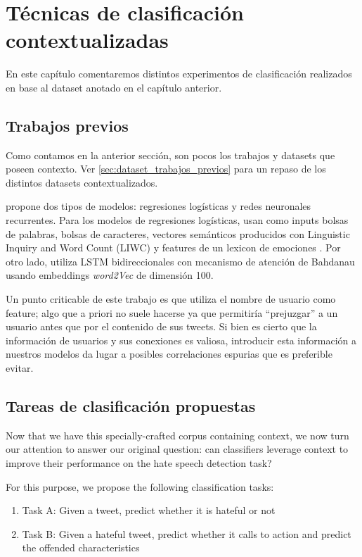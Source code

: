 \section{Técnicas de clasificación contextualizadas}
En este capítulo comentaremos distintos experimentos de clasificación realizados en base al dataset anotado en el capítulo anterior.


\subsection{Trabajos previos}

Como contamos en la anterior sección, son pocos los trabajos y datasets que poseen contexto. Ver \ref{sec:dataset_trabajos_previos} para un repaso de los distintos datasets contextualizados.

\citet{gao2018detecting} propone dos tipos de modelos: regresiones logísticas y redes neuronales recurrentes. Para los modelos de regresiones logísticas, usan como inputs bolsas de palabras, bolsas de caracteres, vectores semánticos producidos con Linguistic Inquiry and Word Count (LIWC) \cite{pennebaker2001linguistic} y features de un lexicon de emociones \cite{mohammad2013nrc}. Por otro lado, utiliza LSTM bidireccionales con mecanismo de atención de Bahdanau \cite{bahdanau2014neural} usando embeddings \emph{word2Vec} de dimensión 100.

Un punto criticable de este trabajo es que utiliza el nombre de usuario como feature; algo que a priori no suele hacerse ya que permitiría ``prejuzgar'' a un usuario antes que por el contenido de sus tweets. Si bien es cierto que la información de usuarios y sus conexiones es valiosa, introducir esta información a nuestros modelos da lugar a posibles correlaciones espurias que es preferible evitar.

\subsection{Tareas de clasificación propuestas}

Now that we have this specially-crafted corpus containing context, we now turn our attention to answer our original question: can classifiers leverage context to improve their performance on the hate speech detection task?

For this purpose, we propose the following classification tasks:

\begin{enumerate}
    \item Task A: Given a tweet, predict whether it is hateful or not
    \item Task B: Given a hateful tweet, predict whether it calls to action and predict the offended characteristics
\end{enumerate}

